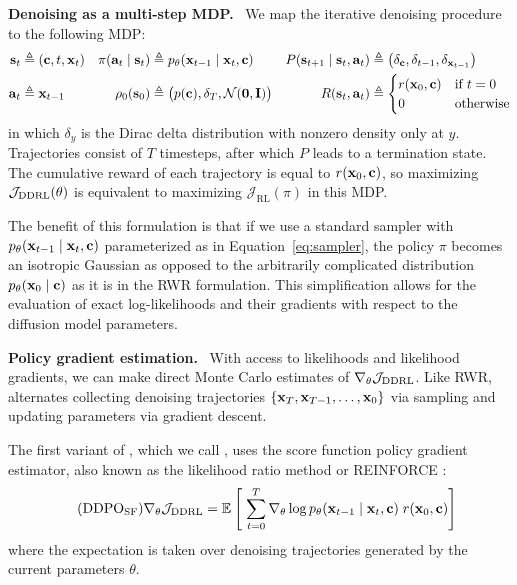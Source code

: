 \textbf{Denoising as a multi-step MDP.}~
We map the iterative denoising procedure to the following MDP:
\begin{align*}
    \mathbf{s}_t &\triangleq (\mathbf{c}, t, \mathbf{x}_t) &
    \pi(\mathbf{a}_t \mid \mathbf{s}_t) &\triangleq p_\theta(\mathbf{x}_{t-1} \mid \mathbf{x}_t, \mathbf{c}) &
    P(\mathbf{s}_{t+1} \mid \mathbf{s}_t, \mathbf{a}_t) &\triangleq \big( \delta_{\mathbf{c}}, \delta_{t-1}, \delta_{\mathbf{x}_{t-1}} \big) \\
    \mathbf{a}_t &\triangleq \mathbf{x}_{t-1} &
    \rho_0(\mathbf{s}_0) &\triangleq \big(p(\mathbf{c}), \delta_T, \mathcal{N}(\mathbf{0}, \mathbf{I})\big) &
    R(\mathbf{s}_t, \mathbf{a}_t) &\triangleq
        \begin{cases}
            r(\mathbf{x}_0, \mathbf{c}) & \text{if } t = 0 \\
            0 & \text{otherwise}
        \end{cases}
\end{align*}
in which $\delta_y$ is the Dirac delta distribution with nonzero density only at $y$.
Trajectories consist of $T$ timesteps, after which $P$ leads to a termination state.
The cumulative reward of each trajectory is equal to $r(\mathbf{x}_0, \mathbf{c})$, so maximizing $\mathcal{J}_{\text{DDRL}}(\theta)$ is equivalent to maximizing $\mathcal{J}_\text{RL}(\pi)$ in this MDP.


The benefit of this formulation is that if we use a standard sampler with $p_\theta(\mathbf{x}_{t-1} \mid \mathbf{x}_t, \mathbf{c})$ parameterized as in Equation~\ref{eq:sampler}, the policy $\pi$ becomes an isotropic Gaussian as opposed to the arbitrarily complicated distribution $p_\theta(\mathbf{x}_0 \mid \mathbf{c})$ as it is in the RWR formulation.
This simplification allows for the evaluation of exact log-likelihoods and their gradients with respect to the diffusion model parameters.

\textbf{Policy gradient estimation.}~
With access to likelihoods and likelihood gradients, we can make direct Monte Carlo estimates of $\nabla_\theta \mathcal{J}_{\text{DDRL}}$.
Like RWR, \methodours{} alternates collecting denoising trajectories $\{\mathbf{x}_T, \mathbf{x}_{T-1}, \dots, \mathbf{x}_0\}$ via sampling and updating parameters via gradient descent.

The first variant of \methodours{}, which we call \methodreinforce{}, uses the score function policy gradient estimator, also known as the likelihood ratio method or REINFORCE \citep{williams1992simple,mohamed2020monte}:
\begin{align}
    \tag{\methodreinforce}
    \nabla_\theta \mathcal{J}_\text{DDRL} &= \expect{}{\; \sum_{t=0}^{T} \nabla_\theta \log p_\theta(\bx_{t-1} \mid \bx_t, \bc) \; r(\bx_0, \bc)} \label{eq:score_pg}
\end{align}
where the expectation is taken over denoising trajectories generated by the current parameters $\theta$.

